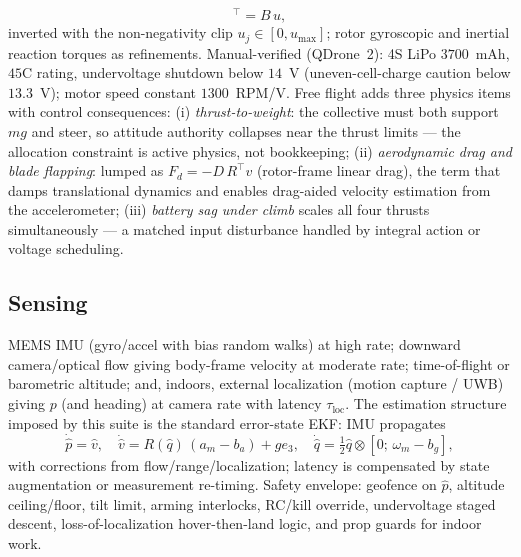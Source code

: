 \documentclass[conference]{IEEEtran}
\begin{document}
\begin{equation}
[\,T,\ \tau_x,\ \tau_y,\ \tau_z\,]^{\!\top} = B\,u,
\label{eq:mixer}
\end{equation}
inverted with the non-negativity clip $u_j\in[0,u_{\max}]$; rotor gyroscopic and inertial reaction torques as refinements. Manual-verified (QDrone~2): 4S LiPo $3700$~mAh, $45$C rating, undervoltage shutdown below $14$~V (uneven-cell-charge caution below $13.3$~V); motor speed constant $1300$~RPM/V. Free flight adds three physics items with control consequences: (i) \emph{thrust-to-weight}: the collective must both support $mg$ and steer, so attitude authority collapses near the thrust limits --- the allocation constraint is active physics, not bookkeeping; (ii) \emph{aerodynamic drag and blade flapping}: lumped as $F_d = -D\,R^{\!\top}v$ (rotor-frame linear drag), the term that damps translational dynamics and enables drag-aided velocity estimation from the accelerometer; (iii) \emph{battery sag under climb} scales all four thrusts simultaneously --- a matched input disturbance handled by integral action or voltage scheduling.

\subsection{Sensing}
MEMS IMU (gyro/accel with bias random walks) at high rate; downward camera/optical flow giving body-frame velocity at moderate rate; time-of-flight or barometric altitude; and, indoors, external localization (motion capture / UWB) giving $p$ (and heading) at camera rate with latency $\tau_{\mathrm{loc}}$. The estimation structure imposed by this suite is the standard error-state EKF: IMU propagates
\begin{equation}
\dot{\hat p} = \hat v,\quad
\dot{\hat v} = R(\hat q)\,(a_m - b_a) + g e_3,\quad
\dot{\hat q} = \tfrac12\hat q\otimes[0;\,\omega_m - b_g],
\end{equation}
with corrections from flow/range/localization; latency is compensated by state augmentation or measurement re-timing. Safety envelope: geofence on $\hat p$, altitude ceiling/floor, tilt limit, arming interlocks, RC/kill override, undervoltage staged descent, loss-of-localization hover-then-land logic, and prop guards for indoor work.

\end{document}
